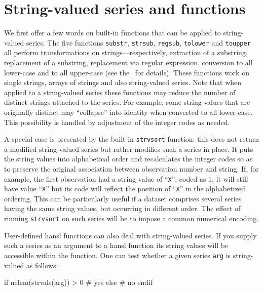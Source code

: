 \section{String-valued series and functions}

We first offer a few words on built-in functions that can be applied
to string-valued series. The five functions \texttt{substr},
\texttt{strsub}, \texttt{regsub}, \texttt{tolower} and
\texttt{toupper} all perform transformations on
strings---respectively, extraction of a substring, replacement of a
substring, replacement via regular expression, conversion to all
lower-case and to all upper-case (see the \GCR\ for details). These
functions work on single strings, arrays of strings and also
string-valued series. Note that when applied to a string-valued series
these functions may reduce the number of distinct strings attached to
the series. For example, some string values that are originally
distinct may ``collapse'' into identity when converted to all
lower-case. This possibility is handled by adjustment of the integer
codes as needed.

A special case is presented by the built-in \texttt{strvsort}
function: this does not return a modified string-valued series but
rather modifies such a series in place. It puts the string values into
alphabetical order and recalculates the integer codes so as to
preserve the original association between observation number and
string. If, for example, the first observation had a string value of
``\texttt{X}'', coded as 1, it will still have value ``\texttt{X}''
but its code will reflect the position of ``\texttt{X}'' in the
alphabetized ordering. This can be particularly useful if a dataset
comprises several series having the same string values, but occurring
in different order. The effect of running \texttt{strvsort} on such
series will be to impose a common numerical encoding.

User-defined hansl functions can also deal with string-valued series.
If you supply such a series as an argument to a hansl function its
string values will be accessible within the function. One can test
whether a given series \texttt{arg} is string-valued as follows:
\begin{code}
if nelem(strvals(arg)) > 0
  # yes
else
  # no
endif
\end{code}

